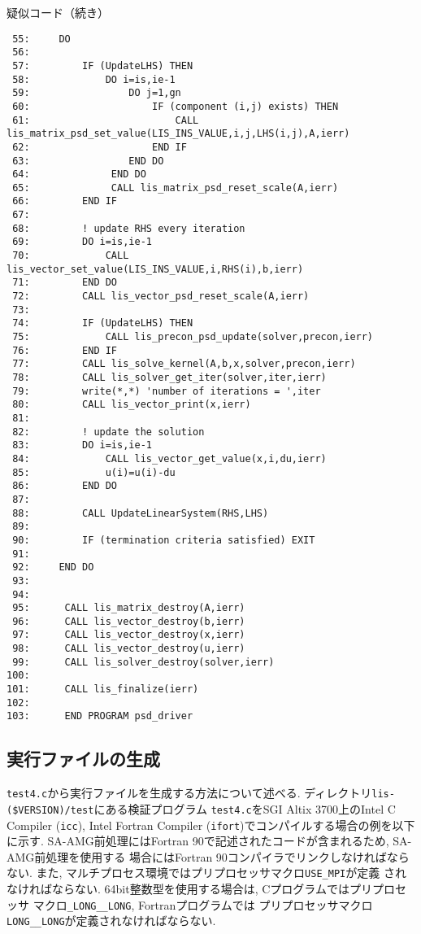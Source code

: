 \documentclass[a4paper]{jarticle}
\begin{document}
{{\begin{itemsquarebox}[l]{疑似コード（続き）}
{\small
\begin{verbatim}
 55:     DO
 56:
 57:         IF (UpdateLHS) THEN
 58:             DO i=is,ie-1
 59:                 DO j=1,gn
 60:                     IF (component (i,j) exists) THEN
 61:                         CALL lis_matrix_psd_set_value(LIS_INS_VALUE,i,j,LHS(i,j),A,ierr)
 62:                     END IF
 63:                 END DO
 64:              END DO
 65:              CALL lis_matrix_psd_reset_scale(A,ierr)
 66:         END IF
 67:
 68:         ! update RHS every iteration
 69:         DO i=is,ie-1
 70:             CALL lis_vector_set_value(LIS_INS_VALUE,i,RHS(i),b,ierr)
 71:         END DO
 72:         CALL lis_vector_psd_reset_scale(A,ierr)
 73:
 74:         IF (UpdateLHS) THEN
 75:             CALL lis_precon_psd_update(solver,precon,ierr)
 76:         END IF
 77:         CALL lis_solve_kernel(A,b,x,solver,precon,ierr)
 78:         CALL lis_solver_get_iter(solver,iter,ierr)
 79:         write(*,*) 'number of iterations = ',iter
 80:         CALL lis_vector_print(x,ierr)
 81:
 82:         ! update the solution
 83:         DO i=is,ie-1
 84:             CALL lis_vector_get_value(x,i,du,ierr)
 85:             u(i)=u(i)-du
 86:         END DO
 87:
 88:         CALL UpdateLinearSystem(RHS,LHS)
 89:
 90:         IF (termination criteria satisfied) EXIT
 91:
 92:     END DO
 93:
 94:
 95:      CALL lis_matrix_destroy(A,ierr)
 96:      CALL lis_vector_destroy(b,ierr)
 97:      CALL lis_vector_destroy(x,ierr)
 98:      CALL lis_vector_destroy(u,ierr)
 99:      CALL lis_solver_destroy(solver,ierr)
100:
101:      CALL lis_finalize(ierr)
102:
103:      END PROGRAM psd_driver
\end{verbatim}
}
\end{itemsquarebox}

\newpage
\subsection{実行ファイルの生成}
\verb|test4.c|から実行ファイルを生成する方法について述べる. 
ディレクトリ\verb|lis-($VERSION)/test|にある検証プログラム
\verb|test4.c|をSGI Altix 3700上のIntel C Compiler (\verb|icc|), 
Intel Fortran Compiler (\verb|ifort|)でコンパイルする場合の例を以下に示す.  
SA-AMG前処理にはFortran 90で記述されたコードが含まれるため, SA-AMG前処理を使用する
場合にはFortran 90コンパイラでリンクしなければならない. 
また, マルチプロセス環境ではプリプロセッサマクロ\verb|USE_MPI|が定義
されなければならない. 
64bit整数型を使用する場合は, Cプログラムではプリプロセッサ
マクロ{\tt \_LONG\_\_LONG}, Fortranプログラムでは
プリプロセッサマクロ{\tt LONG\_\_LONG}が定義されなければならない. 

}}
\end{document}
